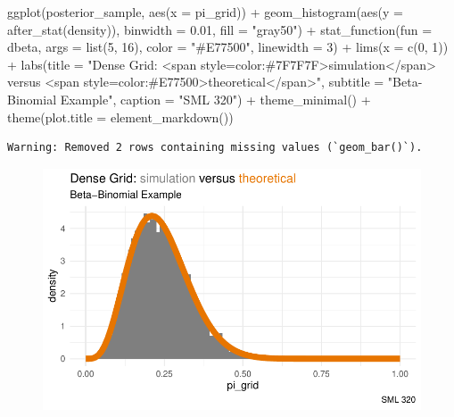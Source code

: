 \documentclass[
  letterpaper,
  DIV=11,
  numbers=noendperiod]{scrartcl}
\newenvironment{Shaded}{\begin{snugshade}}{\end{snugshade}}
\newcommand{\AttributeTok}[1]{\textcolor[rgb]{0.40,0.45,0.13}{#1}}
\newcommand{\DecValTok}[1]{\textcolor[rgb]{0.68,0.00,0.00}{#1}}
\newcommand{\FloatTok}[1]{\textcolor[rgb]{0.68,0.00,0.00}{#1}}
\newcommand{\FunctionTok}[1]{\textcolor[rgb]{0.28,0.35,0.67}{#1}}
\newcommand{\NormalTok}[1]{\textcolor[rgb]{0.00,0.23,0.31}{#1}}
\newcommand{\SpecialCharTok}[1]{\textcolor[rgb]{0.37,0.37,0.37}{#1}}
\newcommand{\StringTok}[1]{\textcolor[rgb]{0.13,0.47,0.30}{#1}}
\begin{document}
\begin{Shaded}
\begin{Highlighting}[]
\FunctionTok{ggplot}\NormalTok{(posterior\_sample, }\FunctionTok{aes}\NormalTok{(}\AttributeTok{x =}\NormalTok{ pi\_grid)) }\SpecialCharTok{+} 
  \FunctionTok{geom\_histogram}\NormalTok{(}\FunctionTok{aes}\NormalTok{(}\AttributeTok{y =} \FunctionTok{after\_stat}\NormalTok{(density)), }
                 \AttributeTok{binwidth =} \FloatTok{0.01}\NormalTok{,}
                 \AttributeTok{fill =} \StringTok{"gray50"}\NormalTok{) }\SpecialCharTok{+} 
  \FunctionTok{stat\_function}\NormalTok{(}\AttributeTok{fun =}\NormalTok{ dbeta, }\AttributeTok{args =} \FunctionTok{list}\NormalTok{(}\DecValTok{5}\NormalTok{, }\DecValTok{16}\NormalTok{),}
                \AttributeTok{color =} \StringTok{"\#E77500"}\NormalTok{, }\AttributeTok{linewidth =} \DecValTok{3}\NormalTok{) }\SpecialCharTok{+} 
  \FunctionTok{lims}\NormalTok{(}\AttributeTok{x =} \FunctionTok{c}\NormalTok{(}\DecValTok{0}\NormalTok{, }\DecValTok{1}\NormalTok{)) }\SpecialCharTok{+}
  \FunctionTok{labs}\NormalTok{(}\AttributeTok{title =} \StringTok{"Dense Grid: \textless{}span style=\textquotesingle{}color:\#7F7F7F\textquotesingle{}\textgreater{}simulation\textless{}/span\textgreater{} versus \textless{}span style=\textquotesingle{}color:\#E77500\textquotesingle{}\textgreater{}theoretical\textless{}/span\textgreater{}"}\NormalTok{,}
         \AttributeTok{subtitle =} \StringTok{"Beta{-}Binomial Example"}\NormalTok{,}
         \AttributeTok{caption =} \StringTok{"SML 320"}\NormalTok{) }\SpecialCharTok{+}
  \FunctionTok{theme\_minimal}\NormalTok{() }\SpecialCharTok{+}
  \FunctionTok{theme}\NormalTok{(}\AttributeTok{plot.title =} \FunctionTok{element\_markdown}\NormalTok{())}
\end{Highlighting}
\end{Shaded}

\begin{verbatim}
Warning: Removed 2 rows containing missing values (`geom_bar()`).
\end{verbatim}

\begin{figure}[H]

{\centering \includegraphics{ps4_code_files/figure-pdf/unnamed-chunk-15-1.pdf}

}

\end{figure}
\end{document}
